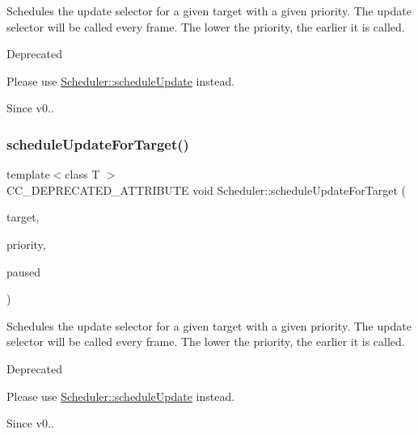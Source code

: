 Schedules the \textquotesingle{}update\textquotesingle{} selector for a given target with a given priority. The \textquotesingle{}update\textquotesingle{} selector will be called every frame. The lower the priority, the earlier it is called. \begin{DoxyRefDesc}{Deprecated}
\item[\hyperlink{deprecated__deprecated000056}{Deprecated}]Please use \textquotesingle{}\hyperlink{classScheduler_ad566d55a4941459c185e6faeddc3a70f}{Scheduler\+::schedule\+Update}\textquotesingle{} instead. \end{DoxyRefDesc}
\begin{DoxySince}{Since}
v0.. 
\end{DoxySince}
\mbox{\label{classScheduler_a87a354dc2bcf3a750ed66f8d67ed0b70}} 
\subsubsection{\texorpdfstring{schedule\+Update\+For\+Target()}{scheduleUpdateForTarget()}\hspace{0.1cm}{\footnotesize\ttfamily [2/2]}}
{\footnotesize\ttfamily template$<$class T $>$ \\
C\+C\+\_\+\+D\+E\+P\+R\+E\+C\+A\+T\+E\+D\+\_\+\+A\+T\+T\+R\+I\+B\+U\+TE void Scheduler\+::schedule\+Update\+For\+Target (\begin{DoxyParamCaption}\item[{T $\ast$}]{target,  }\item[{int}]{priority,  }\item[{bool}]{paused }\end{DoxyParamCaption})\hspace{0.3cm}{\ttfamily [inline]}}

Schedules the \textquotesingle{}update\textquotesingle{} selector for a given target with a given priority. The \textquotesingle{}update\textquotesingle{} selector will be called every frame. The lower the priority, the earlier it is called. \begin{DoxyRefDesc}{Deprecated}
\item[\hyperlink{deprecated__deprecated000291}{Deprecated}]Please use \textquotesingle{}\hyperlink{classScheduler_ad566d55a4941459c185e6faeddc3a70f}{Scheduler\+::schedule\+Update}\textquotesingle{} instead. \end{DoxyRefDesc}
\begin{DoxySince}{Since}
v0.. 
\end{DoxySince}
\mbox{\label{classScheduler_a7aeaef587604d3a1f20ebac7a12b1d77}} 
